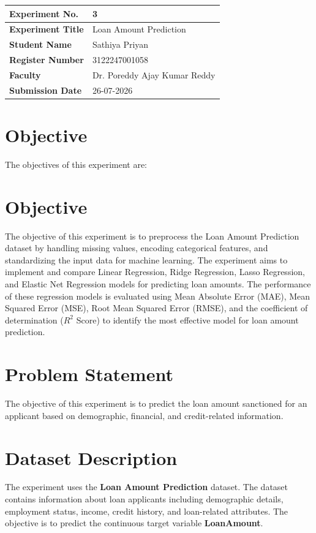 \documentclass{article}
\begin{document}
\setlength{\tabcolsep}{3pt}
\begin{table}[H]
\centering
\renewcommand{\arraystretch}{1.3}
\begin{tabularx}{\textwidth}{|p{4cm}|X|}
\hline
\textbf{Experiment No.} & 3 \\ \hline
\textbf{Experiment Title} & Loan Amount Prediction \\ \hline
\textbf{Student Name} & Sathiya Priyan \\ \hline
\textbf{Register Number} & 3122247001058 \\ \hline
\textbf{Faculty} & Dr. Poreddy Ajay Kumar Reddy \\ \hline
\textbf{Submission Date} & 26-07-2026 \\ \hline
\end{tabularx}
\end{table}
\section{Objective} 
The objectives of this experiment are: 
\section{Objective}

The objective of this experiment is to preprocess the Loan Amount Prediction dataset by handling missing values, encoding categorical features, and standardizing the input data for machine learning. The experiment aims to implement and compare Linear Regression, Ridge Regression, Lasso Regression, and Elastic Net Regression models for predicting loan amounts. The performance of these regression models is evaluated using Mean Absolute Error (MAE), Mean Squared Error (MSE), Root Mean Squared Error (RMSE), and the coefficient of determination ($R^2$ Score) to identify the most effective model for loan amount prediction.

\section{Problem Statement} 
The objective of this experiment is to predict the loan amount sanctioned for an applicant based on demographic, financial, and credit-related information.

\section{Dataset Description} 
The experiment uses the \textbf{Loan Amount Prediction} dataset. The dataset contains information about loan applicants including demographic details, employment status, income, credit history, and loan-related attributes. The objective is to predict the continuous target variable \textbf{LoanAmount}. 
\end{document}
